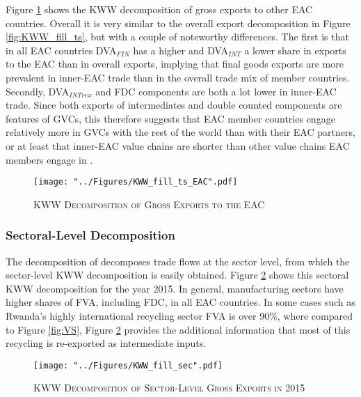 \documentclass[a4paper]{article}
\begin{document}
Figure \ref{fig:KWW_fill_ts_EAC} shows the KWW decomposition of gross exports to other EAC countries. Overall it is very similar to the overall export decomposition in Figure \ref{fig:KWW_fill_ts}, but with a couple of noteworthy differences. The first is that in all EAC countries DVA$_{FIN}$ has a higher and DVA$_{INT}$ a lower share in exports to the EAC than in overall exports, implying that final goods exports are more prevalent in inner-EAC trade than in the overall trade mix of member countries. Secondly, DVA$_{INTrex}$ and FDC components are both a lot lower in inner-EAC trade. Since both exports of intermediates and double counted components are features of GVCs, this therefore suggests that EAC member countries engage relatively more in GVCs with the rest of the world than with their EAC partners, or at least that inner-EAC value chains are shorter than other value chains EAC members engage in \citep{Kummritz20162}. 
\newpage

\begin{figure}[h!] \vspace{-1cm}
\centering
\caption{\label{fig:KWW_fill_ts_EAC}\textsc{KWW Decomposition of Gross Exports to the EAC}}
\texttt{[image: "../Figures/KWW\_fill\_ts\_EAC".pdf]} %
\vspace{-0.8cm}
\end{figure}
\FloatBarrier

\subsubsection{Sectoral-Level Decomposition}
The decomposition of \citet{wang2013quantifying} decomposes trade flows at the sector level, from which the sector-level KWW decomposition is easily obtained. Figure \ref{fig:KWW_fill_sec} shows this sectoral KWW decomposition for the year 2015. In general, manufacturing sectors have higher shares of FVA, including FDC, in all EAC countries. In some cases such as Rwanda's highly international recycling sector FVA is over 90\%, where compared to Figure \ref{fig:VS}, Figure \ref{fig:KWW_fill_sec} provides the additional information that most of this recycling is re-exported as intermediate inputs.  

\begin{figure}[h!] \vspace{-0.1cm}
\centering
\caption{\label{fig:KWW_fill_sec}\textsc{KWW Decomposition of Sector-Level Gross Exports in 2015}}
\texttt{[image: "../Figures/KWW\_fill\_sec".pdf]} %
\vspace{-1.5cm}
\end{figure}
\FloatBarrier
\newpage
\end{document}
